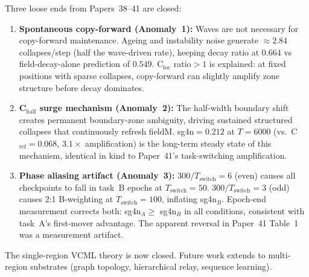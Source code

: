 \documentclass[11pt]{article}
\begin{document}
Three loose ends from Papers~38--41 are closed:
\begin{enumerate}
  \item \textbf{Spontaneous copy-forward (Anomaly~1):}
        Waves are not necessary for copy-forward maintenance.
        Ageing and instability noise generate $\approx 2.84$ collapses/step
        (half the wave-driven rate), keeping decay ratio at $0.664$ vs
        field-decay-alone prediction of $0.549$.
        C$_\mathrm{loc}$ ratio$>1$ is explained: at fixed positions with sparse
        collapses, copy-forward can slightly amplify zone structure before decay
        dominates.
  \item \textbf{C$_\mathrm{half}$ surge mechanism (Anomaly~2):}
        The half-width boundary shift creates permanent boundary-zone
        ambiguity, driving sustained structured collapses that continuously
        refresh fieldM.
        sg4n$=0.212$ at $T=6000$ (vs.\ C$_\mathrm{ref}=0.068$, $3.1\times$
        amplification) is the long-term steady state of this mechanism,
        identical in kind to Paper~41's task-switching amplification.
  \item \textbf{Phase aliasing artifact (Anomaly~3):}
        $300/T_\mathrm{switch}=6$ (even) causes all checkpoints to fall in
        task~B epochs at $T_\mathrm{switch}=50$.
        $300/T_\mathrm{switch}=3$ (odd) causes 2:1 B-weighting at
        $T_\mathrm{switch}=100$, inflating sg4n$_B$.
        Epoch-end measurement corrects both: sg4n$_A \geq $ sg4n$_B$ in all
        conditions, consistent with task~A's first-mover advantage.
        The apparent reversal in Paper~41 Table~1 was a measurement artifact.
\end{enumerate}

\noindent The single-region VCML theory is now closed.
Future work extends to multi-region substrates
(graph topology, hierarchical relay, sequence learning).
\end{document}
